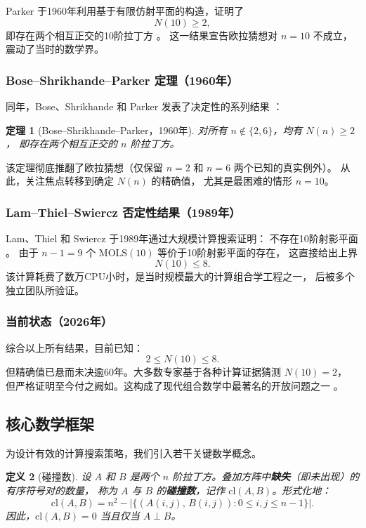 \documentclass[11pt,a4paper]{ctexart}
\newtheorem{theorem}{定理}[section]
\newtheorem{definition}[theorem]{定义}
\theoremstyle{remark}
\newcommand{\cl}{\mathrm{cl}}
\newcommand{\MOLS}{\mathrm{MOLS}}
\begin{document}
Parker 于1960年利用基于有限仿射平面的构造，证明了
\[
  N(10) \ge 2,
\]
即存在两个相互正交的10阶拉丁方 \cite{parker1960}。
这一结果宣告欧拉猜想对 $n = 10$ 不成立，震动了当时的数学界。

\subsubsection{Bose–Shrikhande–Parker 定理（1960年）}

同年，Bose、Shrikhande 和 Parker 发表了决定性的系列结果 \cite{bsp1960}：

\begin{theorem}[Bose–Shrikhande–Parker，1960年]
  对所有 $n \notin \{2, 6\}$，均有 $N(n) \ge 2$，
  即存在两个相互正交的 $n$ 阶拉丁方。
\end{theorem}

该定理彻底推翻了欧拉猜想（仅保留 $n=2$ 和 $n=6$ 两个已知的真实例外）。
从此，关注焦点转移到确定 $N(n)$ 的精确值，
尤其是最困难的情形 $n = 10$。

\subsubsection{Lam–Thiel–Swiercz 否定性结果（1989年）}

Lam、Thiel 和 Swiercz 于1989年通过大规模计算搜索证明：
不存在10阶射影平面 \cite{lam1989}。
由于 $n-1 = 9$ 个 $\MOLS(10)$ 等价于10阶射影平面的存在，
这直接给出上界
\[
  N(10) \le 8.
\]
该计算耗费了数万CPU小时，是当时规模最大的计算组合学工程之一，
后被多个独立团队所验证。

\subsubsection{当前状态（2026年）}

综合以上所有结果，目前已知：
\[
  2 \le N(10) \le 8.
\]
但精确值已悬而未决逾60年。大多数专家基于各种计算证据猜测 $N(10) = 2$，
但严格证明至今付之阙如。这构成了现代组合数学中最著名的开放问题之一
\cite{colbourn2006,denes1991,wanless2011}。

\subsection{核心数学框架}

为设计有效的计算搜索策略，我们引入若干关键数学概念。

\begin{definition}[碰撞数]
  \label{def:collision}
  设 $A$ 和 $B$ 是两个 $n$ 阶拉丁方。叠加方阵中\textbf{缺失}（即未出现）的有序符号对的数量，
  称为 $A$ 与 $B$ 的\textbf{碰撞数}，记作 $\cl(A, B)$。形式化地：
  \[
    \cl(A, B) = n^2 - \bigl|\{(A(i,j),\, B(i,j)) : 0 \le i, j \le n-1\}\bigr|.
  \]
  因此，$\cl(A, B) = 0$ 当且仅当 $A \perp B$。
\end{definition}
\end{document}
